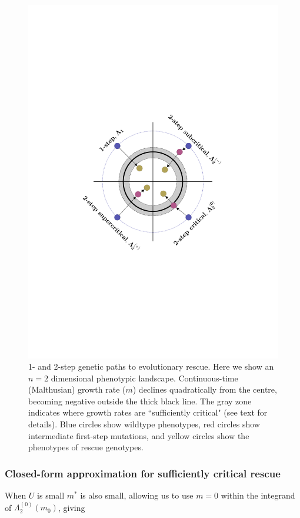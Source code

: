 \documentclass[9pt,twocolumn,twoside,lineno]{gsajnl}
\begin{document}
\begin{figure}[htb]
\centering
\includegraphics[width=\linewidth, trim = {14cm, 35cm, 14cm, 35cm}, clip]{../IMAGES/fgmer_diagrams_code.pdf}
\caption{
1- and 2-step genetic paths to evolutionary rescue.
Here we show an $n=2$ dimensional phenotypic landscape.
Continuous-time (Malthusian) growth rate ($m$) declines quadratically from the centre, becoming negative outside the thick black line.
The gray zone indicates where growth rates are ``sufficiently critical" (see text for details).
Blue circles show wildtype phenotypes, red circles show intermediate first-step mutations, and yellow circles show the phenotypes of rescue genotypes.
}%
\label{fig:paths}
\end{figure}

\subsubsection{Closed-form approximation for sufficiently critical rescue}
When $U$ is small $m^*$ is also small, allowing us to use $m = 0$ within the integrand of $\Lambda_2^{(0)}(m_0)$, giving 
\end{document}
